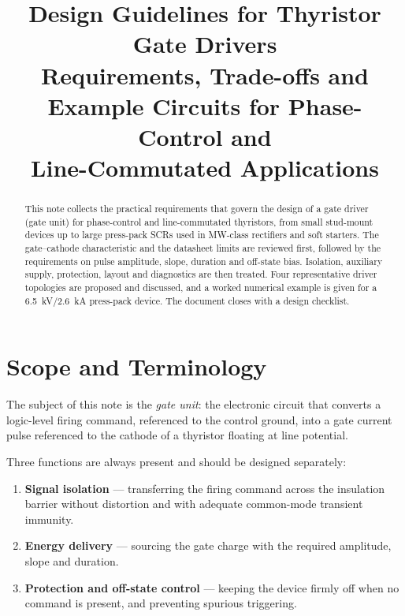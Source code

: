 \documentclass[11pt,a4paper]{article}
\title{Design Guidelines for Thyristor Gate Drivers\\[2mm]
\large Requirements, Trade-offs and Example Circuits for Phase-Control and\\ Line-Commutated Applications}
\author{}
\date{}
\begin{document}
\maketitle

\begin{abstract}
\noindent
This note collects the practical requirements that govern the design of a gate
driver (gate unit) for phase-control and line-commutated thyristors, from small
stud-mount devices up to large press-pack SCRs used in \si{\mega\watt}-class
rectifiers and soft starters. The gate--cathode characteristic and the datasheet
limits are reviewed first, followed by the requirements on pulse amplitude, slope,
duration and off-state bias. Isolation, auxiliary supply, protection, layout and
diagnostics are then treated. Four representative driver topologies are proposed
and discussed, and a worked numerical example is given for a
\SI{6.5}{\kilo\volt}/\SI{2.6}{\kilo\ampere} press-pack device. The document closes
with a design checklist.
\end{abstract}

\tableofcontents

\section{Scope and Terminology}

The subject of this note is the \emph{gate unit}: the electronic circuit that
converts a logic-level firing command, referenced to the control ground, into a
gate current pulse referenced to the cathode of a thyristor floating at line
potential.

Three functions are always present and should be designed separately:

\begin{enumerate}[label=(\roman*)]
  \item \textbf{Signal isolation} --- transferring the firing command across the
        insulation barrier without distortion and with adequate common-mode
        transient immunity.
  \item \textbf{Energy delivery} --- sourcing the gate charge with the required
        amplitude, slope and duration.
  \item \textbf{Protection and off-state control} --- keeping the device firmly
        off when no command is present, and preventing spurious triggering.
\end{enumerate}
\end{document}
